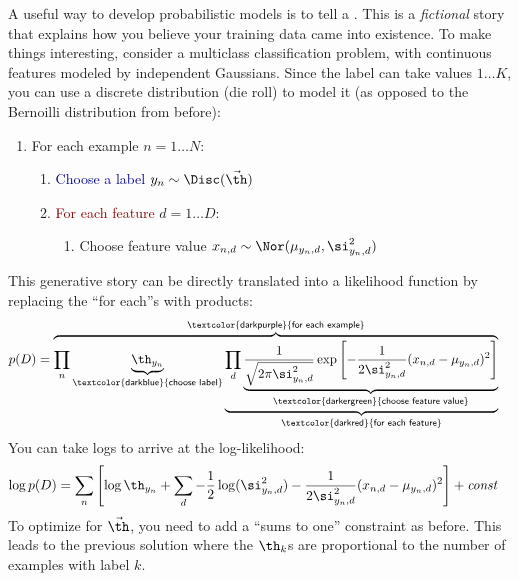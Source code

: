 A useful way to develop probabilistic models is to tell a
.  This is a \emph{fictional} story that
explains how you believe your training data came into existence.  To
make things interesting, consider a multiclass classification problem,
with continuous features modeled by independent Gaussians.  Since the
label can take values $1 \dots K$, you can use a discrete
distribution (die roll) to model it (as opposed to the Bernoilli
distribution from before):
%
\begin{enumerate}
  \item \textcolor{darkpurple}{For each example} $n = 1 \dots N$:
    \begin{enumerate}
      \item \textcolor{darkblue}{Choose a label} $y_n \sim \Disc(\vec\th)$
      \item \textcolor{darkred}{For each feature} $d = 1 \dots D$:
        \begin{enumerate}
          \item \textcolor{darkergreen}{Choose feature value} $x_{n,d} \sim \Nor(\mu_{y_n,d}, \si^2_{y_n,d})$
         \end{enumerate}
     \end{enumerate}
\end{enumerate}
%
This generative story can be directly translated into a likelihood
function by replacing the ``for each''s with products:
%
\begin{align}
  p(D)
  &=  \overbrace{
      \prod_n
       \underbrace{\th_{y_n}}_{\textsf{\textcolor{darkblue}{choose label}}}
       \underbrace{
       \prod_d
         \underbrace{\frac 1 {\sqrt{2 \pi \si_{y_n,d}^2}}
         \exp\left[
           -\frac 1 {2 \si_{y_n,d}^2} (x_{n,d} - \mu_{y_n,d})^2
           \right]}_{\textsf{\textcolor{darkergreen}{choose feature value}}}
         }_{\textsf{\textcolor{darkred}{for each feature}}}}
       ^{\textsf{\textcolor{darkpurple}{for each example}}}
\end{align}
%
You can take logs to arrive at the log-likelihood:
%
\begin{align}
\log p(D)
&= 
\sum_n
  \left[
    \log \th_{y_n} + 
    \sum_d
      -\frac 1 2 \log(\si_{y_n,d}^2)
      -\frac 1 {2 \si_{y_n,d}^2} (x_{n,d} - \mu_{y_n,d})^2
      \right]
  + \textit{const}
\end{align}
%
To optimize for $\vec\th$, you need to add a ``sums to one''
constraint as before.  This leads to the previous solution where the
$\th_k$s are proportional to the number of examples with label $k$.

